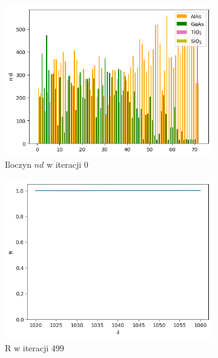 \begin{figure} [H]
\begin{subfigure}[b]{0.32\textwidth}
        \includegraphics[width=\linewidth]{figures/wyniki/losowe/dbr_opt/result_ndresult0.png}
        \caption{Iloczyn $nd$ w iteracji 0}
    \end{subfigure}
        \begin{subfigure}[b]{0.30\textwidth}
        \includegraphics[width=\linewidth]{figures/wyniki/losowe/dbr_opt/result_Rresult499.png}
        \caption{R w iteracji 499}
    \end{subfigure}
        \begin{subfigure}[b]{0.31\textwidth}

\end{subfigure}
\end{figure}
